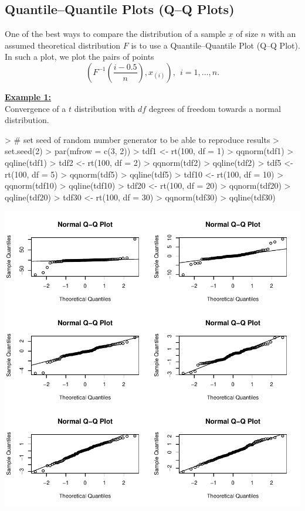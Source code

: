 \documentclass[12pt,letterpaper,final]{article}
\def\ux{\underline{x}}
\begin{document}
\newpage


\subsection{Quantile--Quantile Plots (Q--Q Plots)}


One of the best ways to compare the distribution of a sample $\ux$ of size $n$
with an assumed theoretical distribution $F$ is to use a 
Quantile--Quantile Plot (Q--Q Plot). In such a plot, we plot
the pairs of points
\[
\left( F^{-1} \left( \frac{i - 0.5}{n} \right), x_{(i)} \right), 
~~ i = 1, \ldots, n.
\]


\noindent
\underline{\bf Example 1:} \\
Convergence of a $t$ distribution with $df$ degrees of freedom
towards a normal distribution.

\begin{Schunk}
\begin{Sinput}
> # set seed of random number generator to be able to reproduce results
> set.seed(2) 
> par(mfrow = c(3, 2))
> tdf1 <- rt(100, df = 1)
> qqnorm(tdf1)
> qqline(tdf1)
> tdf2 <- rt(100, df = 2)
> qqnorm(tdf2)
> qqline(tdf2)
> tdf5 <- rt(100, df = 5)
> qqnorm(tdf5)
> qqline(tdf5)
> tdf10 <- rt(100, df = 10)
> qqnorm(tdf10)
> qqline(tdf10)
> tdf20 <- rt(100, df = 20)
> qqnorm(tdf20)
> qqline(tdf20)
> tdf30 <- rt(100, df = 30)
> qqnorm(tdf30)
> qqline(tdf30)
\end{Sinput}
\end{Schunk}
\includegraphics{lect_main-031}
\end{document}
